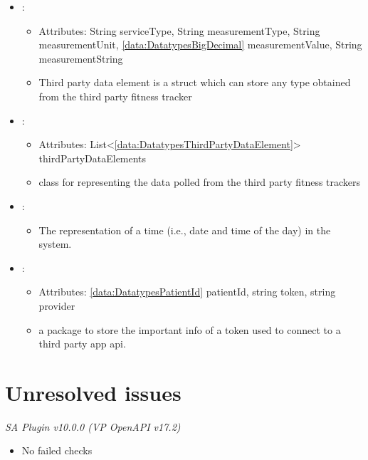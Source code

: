 \begin{itemize}[nolistsep,noitemsep]
\begin{itemize}[noitemsep,nolistsep]
\item[] {\colorbox{red!30}{\underline{Undefined}}}
\end{itemize}

\item {}: 
\begin{itemize}[noitemsep,nolistsep]
\item[] Attributes: String serviceType, String measurementType, String measurementUnit, \ref{data:DatatypesBigDecimal} measurementValue, String measurementString
\item[] Third party data element is a struct which can store any type obtained from the third party fitness tracker
\end{itemize}

\item {}: 
\begin{itemize}[noitemsep,nolistsep]
\item[] Attributes: List\textless{}\ref{data:DatatypesThirdPartyDataElement}\textgreater{} thirdPartyDataElements
\item[] class for representing the data polled from the third party fitness trackers
\end{itemize}

\item {}: 
\begin{itemize}[noitemsep,nolistsep]

\item[] The representation of a time (i.e., date and time of the day) in the system.
\end{itemize}

\item {}: 
\begin{itemize}[noitemsep,nolistsep]
\item[] Attributes: \ref{data:DatatypesPatientId} patientId, string token, string provider
\item[] a package to store the important info of a token used to connect to a third party app api.  
\end{itemize}

\end{itemize}

\section{Unresolved issues}\label{sec:checks}
\emph{SA Plugin v10.0.0 (VP OpenAPI v17.2)}
\begin{itemize}[nolistsep,noitemsep]
\item[] No failed checks
\end{itemize}

%
